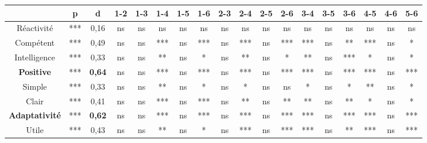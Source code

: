 \begin{table}
    \center
        \begin{tabular}{c|c|c|c|c|c|c|c|c|c|c|c|c|c|c|c|c|c|}
        \cline{2-18}
        \multicolumn{1}{l|}{}                       & p   & d             & 1-2 & 1-3 & \textbf{1-4} & 1-5 & \textbf{1-6} & 2-3 & \textbf{2-4} & 2-5 & \textbf{2-6} & \textbf{3-4} & 3-5 & \textbf{3-6} & \textbf{4-5} & \textbf{4-6} & \textbf{5-6} \\ \hline
        \multicolumn{1}{|c|}{Réactivité}            & *** & 0,16          & ns  & ns  & ns           & ns  & ns           & ns  & ns           & ns  & ns           & ns           & ns  & ns           & ns           & ns           & ns           \\ \hline
        \multicolumn{1}{|c|}{Compétent}             & *** & 0,49          & ns  & ns  & ***          & ns  & ***          & ns  & ***          & ns  & ***          & ***          & ns  & **           & ***          & ns           & *            \\ \hline
        \multicolumn{1}{|c|}{Intelligence}          & *** & 0,33          & ns  & ns  & **           & ns  & *            & ns  & **           & ns  & *            & **           & ns  & ***          & *            & ns           & *            \\ \hline
        \multicolumn{1}{|c|}{\textbf{Positive}}     & *** & \textbf{0,64} & ns  & ns  & ***          & ns  & ***          & ns  & ***          & ns  & ***          & ***          & ns  & ***          & ***          & ns           & ***          \\ \hline
        \multicolumn{1}{|c|}{Simple}                & *** & 0,33          & ns  & ns  & **           & ns  & *            & ns  & *            & ns  & ns           & *            & ns  & *            & **           & ns           & *            \\ \hline
        \multicolumn{1}{|c|}{Clair}                 & *** & 0,41          & ns  & ns  & ***          & ns  & ***          & ns  & **           & ns  & **           & **           & ns  & **           & *            & ns           & *            \\ \hline
        \multicolumn{1}{|c|}{\textbf{Adaptativité}} & *** & \textbf{0,62} & ns  & ns  & ***          & ns  & ***          & ns  & ***          & ns  & ***          & ***          & ns  & ***          & ***          & ns           & ***          \\ \hline
        \multicolumn{1}{|c|}{Utile}                 & *** & 0,43          & ns  & ns  & **           & ns  & *            & ns  & ***          & ns  & ***          & ***          & ns  & **           & ***          & ns           & ***          \\ \hline

\end{tabular}
\end{table}

